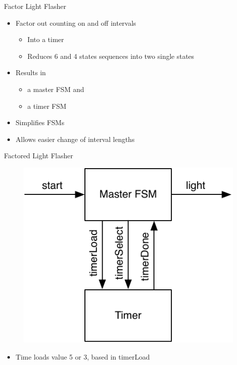 \begin{frame}[fragile]{Factor Light Flasher}
\begin{itemize}
\item Factor out counting on and off intervals
\begin{itemize}
\item Into a timer
\item Reduces 6 and 4 states sequences into two single states
\end{itemize}
\item Results in
\begin{itemize}
\item a master FSM and
\item a timer FSM
\end{itemize}
\item Simplifies FSMs
\item Allows easier change of interval lengths
\end{itemize}
\end{frame}

\begin{frame}[fragile]{Factored Light Flasher}
\begin{figure}
  \includegraphics[scale=\scale]{../figures/flasher}
\end{figure}
\begin{itemize}
\item Time loads value 5 or 3, based in timerLoad
\end{itemize}
\end{frame}

